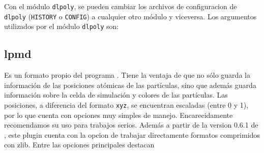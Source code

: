 Con el m\'odulo \verb|dlpoly|, se pueden cambiar los archivos de configuracion de \verb|dlpoly| (\verb|HISTORY| o \verb|CONFIG|) a cualquier otro m\'odulo y viceversa. Los argumentos utilizados por el m\'odulo \verb|dlpoly| son:


\subsection{lpmd}\label{subsec:lpmdformato}

Es un formato propio del programa {\lpmd}. Tiene la ventaja de que no s\'olo guarda la informaci\'on de las posiciones at\'omicas de las part\'iculas, sino que adem\'as guarda informaci\'on sobre la celda de simulaci\'on y colores de las part\'iculas. Las posiciones, a diferencia del formato \verb|xyz|, se encuentran escaladas (entre 0 y 1), por lo que cuenta con opciones muy simples de manejo. Encarecidamente recomendamos su uso para trabajos serios. Adem\'as a partir de la version 0.6.1 de {\lpmd}, este plugin cuenta con la opcion de trabajar directamente formatos comprimidos con zlib. Entre las opciones principales destacan

